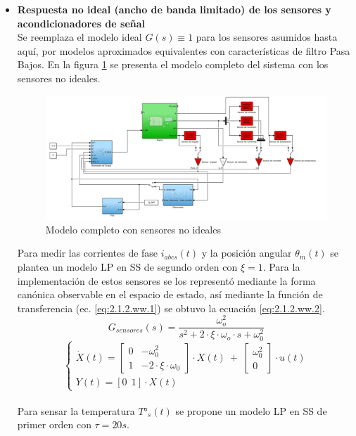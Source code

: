 \documentclass[10pt]{article}
\begin{document}
\begin{itemize}
\item \textbf{Respuesta no ideal (ancho de banda limitado) de los sensores y acondicionadores de señal}\\
Se reemplaza el modelo ideal $G(s)\equiv 1$ para los sensores asumidos hasta aquí, por modelos aproximados equivalentes con características de filtro Pasa Bajos. En la figura \ref{fig:modelocompleto} se presenta el modelo completo del sistema con los sensores no ideales.\\

 \begin{figure}[h!]
	\centering
	\includegraphics[width=\textwidth]{modelocompleto.png}
	\caption{\label{fig:modelocompleto} Modelo completo con sensores no ideales}
	\end{figure}
	
Para medir las corrientes de fase $i_{abcs}(t)$ y la posición angular $\theta_{m}(t)$ se plantea un modelo LP en SS de segundo orden con $\xi=1$. 
Para la implementación de estos sensores se los representó mediante la forma canónica observable en el espacio de estado, así mediante la función de transferencia (ec. \ref{eq:2.1.2.ww.1}) se obtuvo la ecuación \ref{eq:2.1.2.ww.2}.
		\begin{equation}
		G_{sensores}(s)=\frac{\omega_{o}^{2}}{s^{2}+ 2\cdot\xi\cdot\omega_{o}\cdot s + \omega_{0}^{2}}
			\label{eq:2.1.2.ww.1}
	\end{equation}
			\begin{equation}
\begin{cases}
\dot{X}(t)=\begin{bmatrix}
0 & -\omega_{0}^{2}\\ 
1 & -2\cdot\xi\cdot\omega_{0}
\end{bmatrix}
\cdot X(t)  \ + \
\begin{bmatrix}
\omega_{0}^{2}\\ 
0
\end{bmatrix} \cdot
u(t)
\\ 
Y(t)=[0 \ \ 1]\cdot X(t)
\end{cases}
			\label{eq:2.1.2.ww.2}
	\end{equation}\\
Para sensar la temperatura $T°_{s}(t)$ se propone un modelo LP en SS de primer orden con $\tau=20s$.


\end{itemize}
\end{document}
